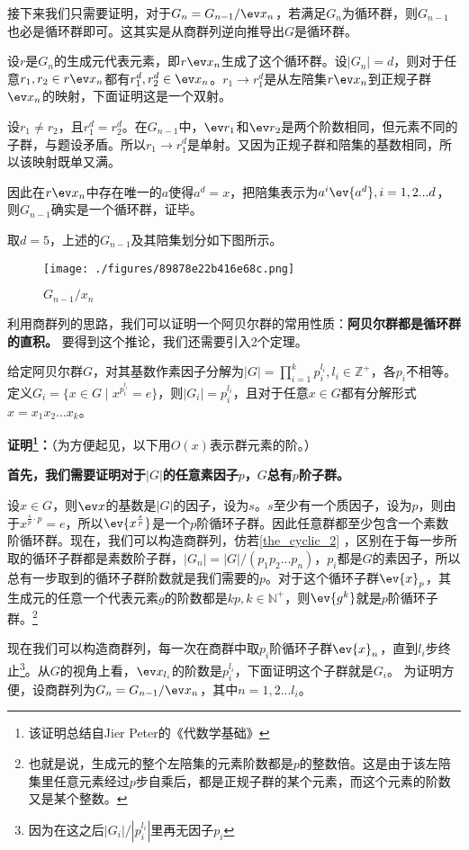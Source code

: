 接下来我们只需要证明，对于$G_{n}=G_{n-1}/\ev x_n$，若满足$G_{n}$为循环群，则$G_{n-1}$也必是循环群即可。这其实是从商群列逆向推导出$G$是循环群。

设$r$是$G_n$的生成元代表元素，即$r\ev x_n$生成了这个循环群。设$|G_{n}|=d$，则对于任意$r_1,r_2\in r\ev x_n$都有$r_1^d,r_2^d\in\ev x_n$。$r_1\rightarrow r_1^d$是从左陪集$r\ev x_n$到正规子群$\ev x_n$的映射，下面证明这是一个双射。

设$r_1\neq r_2$，且$r_1^d=r_2^d$。在$G_{n-1}$中，$\ev r_1$和$\ev r_2$是两个阶数相同，但元素不同的子群，与题设矛盾。所以$r_1\rightarrow r_1^d$是单射。又因为正规子群和陪集的基数相同，所以该映射既单又满。

因此在$r\ev x_n$中存在唯一的$a$使得$a^d=x$，把陪集表示为$a^i\ev {a^d},i=1,2...d$，则$G_{n-1}$确实是一个循环群，证毕。

取$d=5$，上述的$G_{n-1}$及其陪集划分如下图所示。
\begin{figure}[ht]
\centering
\texttt{[image: ./figures/89878e22b416e68c.png]}
\caption{$G_{n-1}/x_n$} \label{fig_cyclic_2}
\end{figure}
利用商群列的思路，我们可以证明一个阿贝尔群的常用性质：\textbf{阿贝尔群都是循环群的直积。
}要得到这个推论，我们还需要引入2个定理。
\begin{theorem}{}
给定阿贝尔群$G$，对其基数作素因子分解为$|G|=\prod_{i=1}^{k} p_{i}^{l_{i}},l_i\in\mathbb{Z}^+$，各$p_i$不相等。
定义$G_i = \{x \in G \mid x^{p_i^{l_i}} = e\}$，则$|G_i|=p_i^{l_i}$，且对于任意$x\in G$都有分解形式$x=x_1x_2...x_k$。
\end{theorem}
\textbf{证明\footnote{该证明总结自Jier Peter的《代数学基础》}：}（为方便起见，以下用$O(x)$表示群元素的阶。）

\textbf{首先，我们需要证明对于$|G|$的任意素因子$p$，$G$总有$p$阶子群。}

设$x\in G$，则$\ev x$的基数是$|G|$的因子，设为$s$。$s$至少有一个质因子，设为$p$，则由于$x^{\frac{s}{p}\cdot p}=e$，所以$\ev {x^{\frac{s}{p}}}$是一个$p$阶循环子群。因此任意群都至少包含一个素数阶循环群。现在，我们可以构造商群列，仿若\autoref{the_cyclic_2} ，区别在于每一步所取的循环子群都是素数阶子群，$|G_n|=|G|/(p_1p_2...p_n)$，$p_i$都是$G$的素因子，所以总有一步取到的循环子群阶数就是我们需要的$p$。对于这个循环子群$\ev {x}_p$，其生成元的任意一个代表元素$g$的阶数都是$kp,k\in \mathbb N^{+}$，则$\ev{g^k}$就是$p$阶循环子群。\footnote{也就是说，生成元的整个左陪集的元素阶数都是$p$的整数倍。这是由于该左陪集里任意元素经过$p$步自乘后，都是正规子群的某个元素，而这个元素的阶数又是某个整数。}

现在我们可以构造商群列，每一次在商群中取$p_i$阶循环子群$\ev{x}_{n}$，直到$l_i$步终止\footnote{因为在这之后$|G_i|/|p_i^{l_i}|$里再无因子$p_i$}。从$G$的视角上看，$\ev x_{l_i}$的阶数是$p_i^{l_i}$，下面证明这个子群就是$G_i$。
为证明方便，设商群列为$G_n=G_{n-1}/\ev x_n$，其中$ n=1,2...l_i$。

